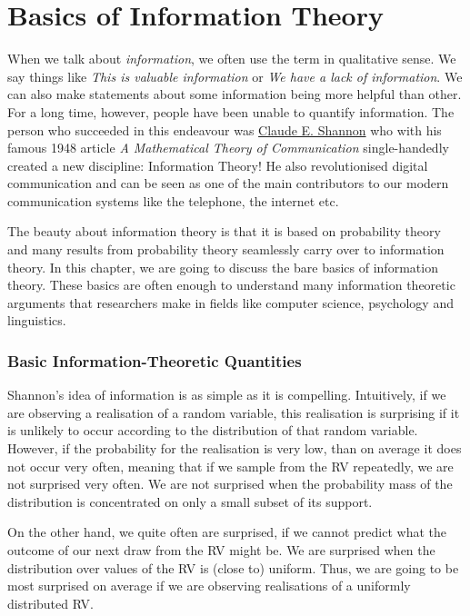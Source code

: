 \chapter{Basics of Information Theory}

When we talk about \textit{information}, we often use the term in qualitative sense. We say things like 
\textit{This is valuable information} or 
\textit{We have a lack of information}. We can also make statements about some information being more helpful than other. For a long time, however,
people have been unable to quantify information. The person who succeeded in this endeavour was \href{https://en.wikipedia.org/wiki/Claude_Shannon}{Claude E. Shannon}
who with his famous 1948 article \textit{A Mathematical Theory of Communication} single-handedly created a new discipline: Information Theory! He also revolutionised
digital communication and can be seen as one of the main contributors to our modern communication systems like the telephone, the internet etc. 

The beauty about information theory is that it is based on probability theory and many results from probability theory seamlessly carry over to information theory.
In this chapter, we are going to discuss the bare basics of information theory. These basics are often enough to understand many information theoretic arguments
that researchers make in fields like computer science, psychology and linguistics.

\subsection{Basic Information-Theoretic Quantities}
Shannon's idea of information is as simple as it is compelling. Intuitively, if we are observing a realisation of a random variable, this realisation is surprising
if it is unlikely to occur according to the distribution of that random variable. However, if the probability for the realisation is very low, than on average it
does not occur very often, meaning that if we sample from the RV repeatedly, we are not surprised very often. We are not surprised when the probability
mass of the distribution is concentrated on only a small subset of its support. 

On the other hand, we quite often are surprised,
if we cannot predict what the outcome of our next draw from the RV might be. We are surprised when the distribution over values of the RV is (close to) uniform. Thus,
we are going to be most surprised on average if we are observing realisations of a uniformly distributed RV.

